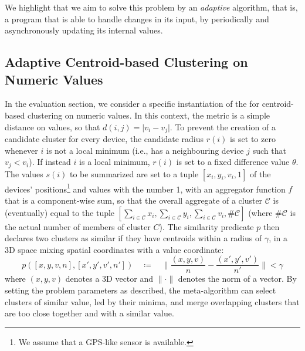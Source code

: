 %


We highlight that we aim to solve this problem by an \emph{adaptive} algorithm,
 that is, a program that is able to handle changes in its input, by periodically and asynchronously updating its internal values.

\subsection{Adaptive Centroid-based Clustering on Numeric Values} \label{ssec:instantiation}

In the evaluation section, we consider a specific instantiation of the 
 for centroid-based clustering on numeric values.
 In this context, the metric is a simple distance on values, so that $d(i, j) = \lvert v_i - v_j \rvert$.
 To prevent the creation of a candidate cluster for every device, the candidate radius $r(i)$ is set to zero whenever $i$ is not a local minimum
 (i.e., has a neighbouring device $j$ such that $v_j < v_i$). If instead $i$ is a local minimum, $r(i)$ is set to a fixed difference value $\theta$.
 The values $s(i)$ to be summarized are set to a tuple $[x_i, y_i, v_i, 1]$ of the devices' positions\footnote{We assume that a GPS-like sensor is available.} and values with the number 1,
 with an aggregator function $f$ that is a component-wise sum, so that the overall aggregate of a cluster $\mathcal{C}$ is (eventually) equal to the tuple
 $[\sum_{i \in \mathcal{C}} x_i, \sum_{i \in \mathcal{C}} y_i, \sum_{i \in \mathcal{C}} v_i, \#\mathcal{C}]$ (where $\#\mathcal{C}$ is the actual number of members of cluster $C$).
 The similarity predicate $p$ then declares two clusters as similar if they have centroids within a radius of $\gamma$,
 in a 3D space mixing spatial coordinates with a value coordinate:
\[
p([x, y, v, n], [x', y', v', n']) \quad\coloneqq\quad \lVert \frac{(x,y,v)}{n} - \frac{(x',y',v')}{n'} \rVert < \gamma
\]
where $(x,y,v)$ denotes a 3D vector and $\lVert \cdot \rVert$ denotes the norm of a vector.
 By setting the problem parameters as described, the meta-algorithm can select clusters of similar value,
 led by their minima, and merge overlapping clusters that are too close together and with a similar value.

